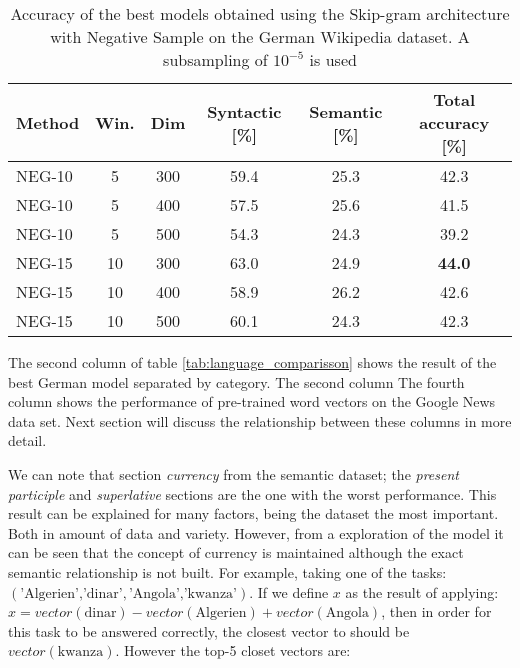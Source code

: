 \begin{table}[h]
\centering

\caption{Accuracy of the best models obtained using the Skip-gram
  architecture with Negative Sample on the German Wikipedia dataset. A
  subsampling of $10^{-5}$ is used} 
\label{tab:main_results}




\small
\begin{tabular}{|l|c|c|cc|c|}
\hline
Method  &  Win.  &  Dim   &  Syntactic [\%] & Semantic
[\%] &  Total accuracy [\%]  \\
\hline

NEG-10  &   5  &  300  &  59.4  &  25.3  &  42.3  \\
 NEG-10  &   5  &  400  &  57.5  &  25.6  &  41.5  \\
 NEG-10  &   5  &  500  &  54.3  &  24.3  &  39.2  \\
 NEG-15  &  10  &  300  &  63.0  &  24.9  &  \textbf{44.0}  \\
 NEG-15  &  10  &  400  &  58.9  &  26.2  &  42.6  \\
 NEG-15  &  10  &  500  &  60.1  &  24.3  &  42.3  \\
\hline
\end{tabular}
\end{table}

The second column of table \ref{tab:language_comparisson} shows the result of
the best German model separated by category. The second column The fourth column
shows the performance of pre-trained word vectors on the Google News data
set. Next section will discuss the relationship between these columns in more detail.

We can note that section  \textit{currency} from
the semantic dataset; the \textit{present participle}  and 
\textit{superlative}  sections are the one with the  worst performance. This
result can be explained for many factors, being the dataset the most
important. Both in amount of data and variety. However, from a exploration of
the model it can be seen that the concept of currency is maintained although
the exact semantic relationship is not built.  For example, taking one of the
tasks:  $(\text{'Algerien','dinar'},\text{'Angola','kwanza'})$. If we define
$x$ as the result of applying:  $x = vector(\text{dinar}) -
vector(\text{Algerien}) + vector(\text{Angola})$, then in order for this task
to be answered correctly, the closest vector to should be $vector(\text{kwanza})$.
However the top-5 closet vectors are:


